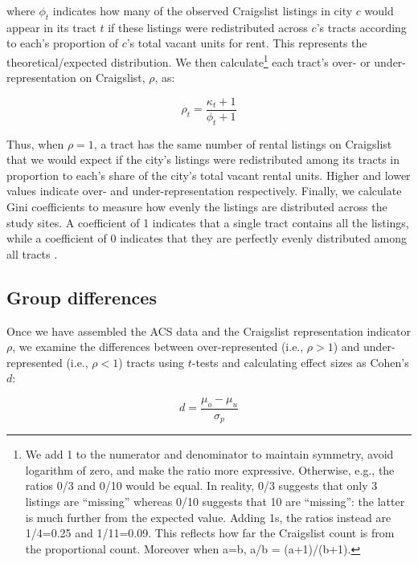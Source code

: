 \documentclass[11pt,onecolumn]{article} %
\begin{document}
where $\phi_t$ indicates how many of the observed Craigslist listings in city $c$ would appear in its tract $t$ if these listings were redistributed across $c$'s tracts according to each's proportion of $c$'s total vacant units for rent. This represents the theoretical/expected distribution. We then calculate\footnote{We add 1 to the numerator and denominator to maintain symmetry, avoid logarithm of zero, and make the ratio more expressive. Otherwise, e.g., the ratios 0/3 and 0/10 would be equal. In reality, 0/3 suggests that only 3 listings are \enquote{missing} whereas 0/10 suggests that 10 are \enquote{missing}: the latter is much further from the expected value. Adding 1s, the ratios instead are 1/4=0.25 and 1/11=0.09. This reflects how far the Craigslist count is from the proportional count. Moreover when a=b, a/b = (a+1)/(b+1).} each tract's over- or under-representation on Craigslist, $\rho$, as:

\begin{equation}
	\label{eq:representation}
	\rho_t = \frac{\kappa_t + 1}{\phi_t + 1}
\end{equation}

Thus, when $\rho=1$, a tract has the same number of rental listings on Craigslist that we would expect if the city's listings were redistributed among its tracts in proportion to each's share of the city's total vacant rental units. Higher and lower values indicate over- and under-representation respectively. Finally, we calculate Gini coefficients to measure how evenly the listings are distributed across the study sites. A coefficient of 1 indicates that a single tract contains all the listings, while a coefficient of 0 indicates that they are perfectly evenly distributed among all tracts \citep{giorgi_gini_2017}.





\subsection{Group differences}

Once we have assembled the ACS data and the Craigslist representation indicator $\rho$, we examine the differences between over-represented (i.e., $\rho>1$) and under-represented (i.e., $\rho<1$) tracts using $t$-tests and calculating effect sizes as Cohen's $d$:

\begin{equation}
	\label{eq:cohen_d}
	d = \frac{\mu_o - \mu_u}{\sigma_p}
\end{equation}
\end{document}
